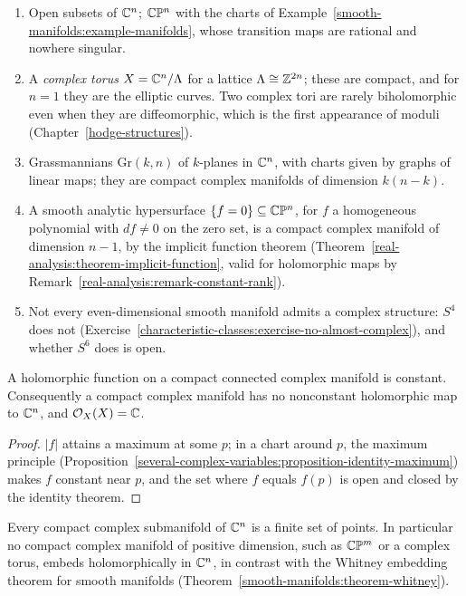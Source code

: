 \begin{example}\label{complex-manifolds:example-complex-manifolds}
\begin{enumerate}
\item Open subsets of $\mathbb{C}^n$; $\mathbb{C}\mathbb{P}^n$ with the charts of Example~\ref{smooth-manifolds:example-manifolds}, whose transition maps are rational and nowhere singular.
\item A \emph{complex torus} $X = \mathbb{C}^n/\Lambda$ for a lattice $\Lambda \cong \mathbb{Z}^{2n}$; these are compact, and for $n = 1$ they are the elliptic curves. Two complex tori are rarely biholomorphic even when
they are diffeomorphic, which is the first appearance of moduli (Chapter~\ref{hodge-structures}).
\item Grassmannians $\mathrm{Gr}(k, n)$ of $k$-planes in $\mathbb{C}^n$, with charts given by graphs of linear maps; they are compact complex manifolds of dimension $k(n-k)$.
\item A smooth analytic hypersurface $\{f = 0\} \subseteq \mathbb{C}\mathbb{P}^n$, for $f$ a homogeneous polynomial with $df \neq 0$ on the zero set, is a compact complex manifold of dimension $n - 1$, by the implicit
function theorem (Theorem~\ref{real-analysis:theorem-implicit-function}, valid for holomorphic maps by Remark~\ref{real-analysis:remark-constant-rank}).
\item Not every even-dimensional smooth manifold admits a complex structure: $S^4$ does not (Exercise~\ref{characteristic-classes:exercise-no-almost-complex}), and whether $S^6$ does is open.
\end{enumerate}
\end{example}

\begin{proposition}\label{complex-manifolds:proposition-no-functions}
A holomorphic function on a compact connected complex manifold is constant. Consequently a compact complex manifold has no nonconstant holomorphic map to $\mathbb{C}^n$, and $\mathcal{O}_X(X) = \mathbb{C}$.
\end{proposition}

\begin{proof}
$|f|$ attains a maximum at some $p$; in a chart around $p$, the maximum principle
(Proposition~\ref{several-complex-variables:proposition-identity-maximum}) makes $f$ constant near $p$, and the set where $f$ equals $f(p)$ is open and closed by the identity theorem.
\end{proof}

\begin{corollary}\label{complex-manifolds:corollary-compact-submanifolds}
Every compact complex submanifold of $\mathbb{C}^n$ is a finite set of points. In particular no compact complex manifold of positive dimension, such as $\mathbb{C}\mathbb{P}^m$ or a complex torus, embeds holomorphically in $\mathbb{C}^n$, in contrast with the
Whitney embedding theorem for smooth manifolds (Theorem~\ref{smooth-manifolds:theorem-whitney}).
\end{corollary}

